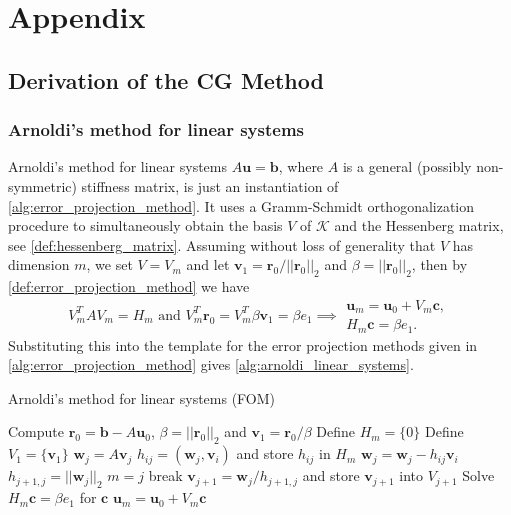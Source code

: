 \chapter*{Appendix}
\label{ch:appendix}

\section{Derivation of the CG Method}\label{sec:cg_derivation}

\subsection{Arnoldi's method for linear systems}\label{sec:arnoldi_linear_systems}
Arnoldi's method for linear systems $A\mathbf{u} = \mathbf{b}$, where $A$ is a general (possibly non-symmetric) stiffness matrix, is just an instantiation of \cref{alg:error_projection_method}. It uses a Gramm-Schmidt orthogonalization procedure to simultaneously obtain the basis $V$ of $\mathcal{K}$ and the Hessenberg matrix, see \cref{def:hessenberg_matrix}. Assuming without loss of generality that $V$ has dimension $m$, we set $V=V_m$ and let $\mathbf{v}_1 = \mathbf{r}_0/||\mathbf{r}_0||_2$ and $\beta = ||\mathbf{r}_0||_2$, then by \cref{def:error_projection_method} we have
\[
  V^T_mAV_m = H_m \text{ and } V^T_m\mathbf{r}_0 = V^T_m\beta \mathbf{v}_1 = \beta e_1 \implies
  \begin{array}{c}
    \mathbf{u}_m = \mathbf{u}_0 + V_m \mathbf{c}, \\
    H_m \mathbf{c} = \beta e_1.
  \end{array}
\]
Substituting this into the template for the error projection methods given in \cref{alg:error_projection_method} gives \cref{alg:arnoldi_linear_systems}.
\begin{algorithm}[H]
  \caption{Arnoldi's method for linear systems (FOM) \cite[Algorithm 6.4]{iter_method_saad}}
  \label{alg:arnoldi_linear_systems}
  \begin{algorithmic}
    \State Compute $\mathbf{r}_0 = \mathbf{b} - A\mathbf{u}_0$, $\beta = ||\mathbf{r}_0||_2$ and $\mathbf{v}_1 = \mathbf{r}_0 / \beta$
    \State Define $H_m = \{0\}$
    \State Define $V_1 = \{\mathbf{v}_1\}$
    \State $\mathbf{w}_j = A\mathbf{v}_j$
    \State $h_{ij} = (\mathbf{w}_j, \mathbf{v}_i)$ and store $h_{ij}$ in $H_m$
    \State $\mathbf{w}_j = \mathbf{w}_j - h_{ij}\mathbf{v}_i$
    \EndFor
    \State $h_{j+1,j} = ||\mathbf{w}_j||_2$
    \State $m = j$
    \State break
    \EndIf
    \State $\mathbf{v}_{j+1} = \mathbf{w}_j / h_{j+1,j}$ and store $\mathbf{v}_{j+1}$ into $V_{j+1}$
    \EndFor
    \State Solve $H_m \mathbf{c} = \beta e_1$ for $\mathbf{c}$
    \State $\mathbf{u}_m = \mathbf{u}_0 + V_m \mathbf{c}$
  \end{algorithmic}
\end{algorithm}

